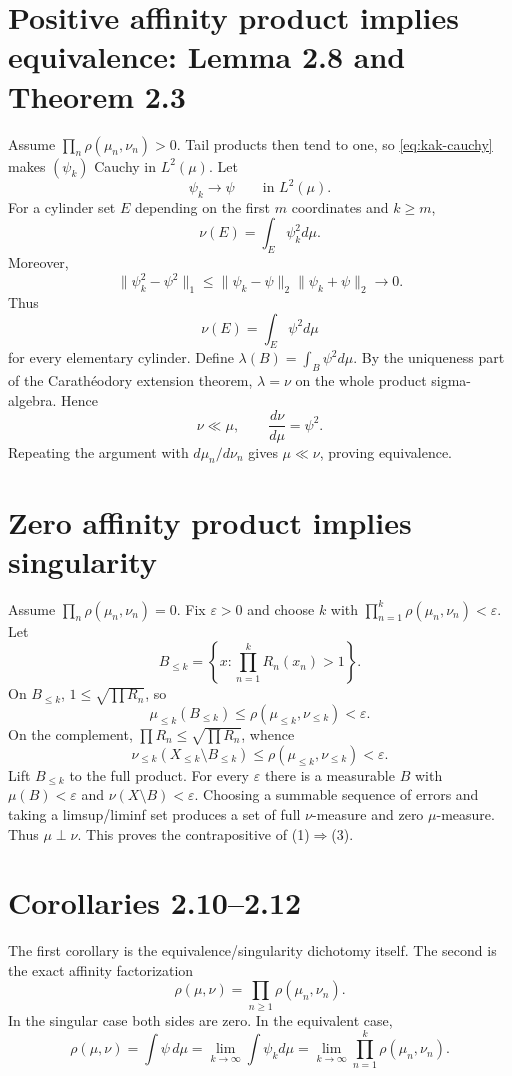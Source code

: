 \section{Positive affinity product implies equivalence: Lemma 2.8 and Theorem 2.3}
Assume \(\prod_n\rho(\mu_n,\nu_n)>0\).  Tail products then tend to one, so
\eqref{eq:kak-cauchy} makes \((\psi_k)\) Cauchy in \(L^2(\mu)\).  Let
\[
 \psi_k\longrightarrow\psi\qquad\text{in }L^2(\mu).
\]
For a cylinder set \(E\) depending on the first \(m\) coordinates and \(k\ge m\),
\[
 \nu(E)=\int_E\psi_k^2d\mu.
\]
Moreover,
\[
 \|\psi_k^2-\psi^2\|_1
 \le\|\psi_k-\psi\|_2\|\psi_k+\psi\|_2\longrightarrow0.
\]
Thus
\begin{equation}\label{eq:kak-cylinder-limit}
 \nu(E)=\int_E\psi^2d\mu
\end{equation}
for every elementary cylinder.  Define \(\lambda(B)=\int_B\psi^2d\mu\).  By the uniqueness part
of the Carath\'eodory extension theorem, \(\lambda=\nu\) on the whole product sigma-algebra.  Hence
\begin{equation}\label{eq:kak-product-rn}
 \nu\ll\mu,
 \qquad
 \frac{d\nu}{d\mu}=\psi^2.
\end{equation}
Repeating the argument with \(d\mu_n/d\nu_n\) gives \(\mu\ll\nu\), proving equivalence.

\section{Zero affinity product implies singularity}
Assume \(\prod_n\rho(\mu_n,\nu_n)=0\).  Fix \(\varepsilon>0\) and choose \(k\) with
\(\prod_{n=1}^k\rho(\mu_n,\nu_n)<\varepsilon\).  Let
\[
 B_{\le k}=
 \left\{x:\prod_{n=1}^kR_n(x_n)>1\right\}.
\]
On \(B_{\le k}\), \(1\le\sqrt{\prod R_n}\), so
\[
 \mu_{\le k}(B_{\le k})
 \le\rho(\mu_{\le k},\nu_{\le k})<\varepsilon.
\]
On the complement, \(\prod R_n\le\sqrt{\prod R_n}\), whence
\[
 \nu_{\le k}(X_{\le k}\setminus B_{\le k})
 \le\rho(\mu_{\le k},\nu_{\le k})<\varepsilon.
\]
Lift \(B_{\le k}\) to the full product.  For every \(\varepsilon\) there is a measurable \(B\) with
\(\mu(B)<\varepsilon\) and \(\nu(X\setminus B)<\varepsilon\).  Choosing a summable sequence of
errors and taking a limsup/liminf set produces a set of full \(\nu\)-measure and zero
\(\mu\)-measure.  Thus \(\mu\perp\nu\).  This proves the contrapositive of (1)\(\Rightarrow\)(3).

\section{Corollaries 2.10--2.12}
The first corollary is the equivalence/singularity dichotomy itself.  The second is the exact affinity
factorization
\begin{equation}\label{eq:kak-infinite-affinity}
 \rho(\mu,\nu)=\prod_{n\ge1}\rho(\mu_n,\nu_n).
\end{equation}
In the singular case both sides are zero.  In the equivalent case,
\[
 \rho(\mu,\nu)=\int\psi\,d\mu
 =\lim_{k\to\infty}\int\psi_kd\mu
 =\lim_{k\to\infty}\prod_{n=1}^k\rho(\mu_n,\nu_n).
\]

